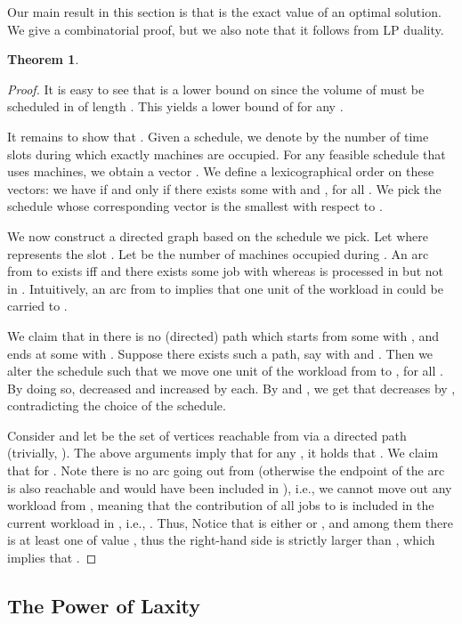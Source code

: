 \documentclass[letterpaper,11pt]{article}
\newtheorem{theorem}{Theorem}
\begin{document}
Our main result in this section is that  is the exact value of an optimal solution. We give a combinatorial proof, but we also note that it follows from LP duality.
\begin{theorem}
\label{thm: strong-density}

\end{theorem}
\begin{proof}
It is easy to see that  is a lower bound on  since the volume of  must be scheduled in  of length . This yields a lower bound of  for any .

It remains to show that . Given a schedule, we denote by  the number of time slots  during which exactly  machines are occupied. For any feasible schedule that uses  machines, we obtain a vector . We define a lexicographical order  on these vectors: we have  if and only if there exists some  with  and , for all . We pick the schedule whose corresponding vector is the smallest with respect to .

We now construct a directed graph  based on the schedule we pick. Let  where  represents the slot .
Let  be the number of machines occupied during . An arc from  to  exists iff  and there exists some job  with  whereas  is processed in  but not in .
Intuitively, an arc from  to  implies that one unit of the workload in  could be carried to .

We claim that in  there is no (directed) path which starts from some  with , and ends at some  with . Suppose there exists such a path, say  with  and . Then we alter the schedule such that we move one unit of the workload from  to , for all . By doing so,  decreased and  increased by  each. By  and , we get that  decreases by , contradicting the choice of the schedule.

Consider  and let  be the set of vertices reachable from  via a directed path (trivially, ). The above arguments imply that for any , it holds that . We claim that  for . Note there is no arc going out from  (otherwise the endpoint of the arc is also reachable and would have been included in ), i.e., we cannot move out any workload from , meaning that the contribution of all jobs to  is included in the current workload in , i.e., . Thus, 
Notice that  is either  or , and among them there is at least one of value , thus the right-hand side is strictly larger than , which implies that .  
\end{proof} 

\subsection{The Power of Laxity} \label{subsec: oa-pow-lax}
\end{document}
